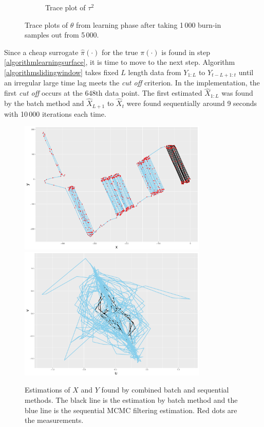 \begin{figure}[h]
\begin{subfigure}[t]{0.45\textwidth}
	\caption{Trace plot of $\tau^2$}
\end{subfigure}
\caption{Trace plots of $\theta$ from learning phase after taking 1\,000 burn-in samples out from 5\,000. }
\end{figure}


Since a cheap surrogate $\hat{\pi}(\cdot)$ for the true $\pi(\cdot)$ is found in step \ref{algorithmlearningsurface}, it is time to move to the next step. Algorithm \ref{algorithmslidingwindow} takes fixed $L$ length data from $Y_{1:L}$ to $Y_{t-L+1:t}$ until an irregular large time lag meets the \textit{cut off} criterion. In the implementation, the first \textit{cut off} occurs at the $648$th data point. The first estimated $\hat{X}_{1:L}$ was found by the batch method and $\hat{X}_{L+1}$ to $\hat{X}_{t}$ were found sequentially around 9 seconds with 10\,000 iterations each time. 

\begin{figure}[h]
\centering
\includegraphics[width=0.8\textwidth]{Chapters/05MCMCOU/plots/realdatabatchPosition2.pdf}
\includegraphics[width=0.8\textwidth]{Chapters/05MCMCOU/plots/realdatabatchVelocity2.pdf}
\caption{Estimations of $X$ and $Y$ found by combined batch and sequential methods. The black line is the estimation by batch method and the blue line is the sequential MCMC filtering estimation. Red dots are the measurements.}
\end{figure}

